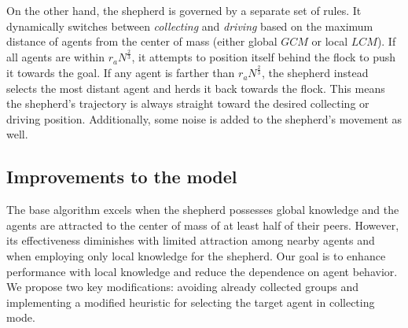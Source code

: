 \documentclass[9pt]{pnas-new}
\begin{document}
On the other hand, the shepherd is governed by a separate set of rules. It dynamically switches between \textit{collecting} and \textit{driving} based on the maximum distance of agents from the center of mass (either global $GCM$ or local $LCM$). If all agents are within $r_aN^\frac{2}{3}$, it attempts to position itself behind the flock to push it towards the goal. If any agent is farther than $r_aN^{\frac{2}{3}}$, the shepherd instead selects the most distant agent and herds it back towards the flock. This means the shepherd's trajectory is always straight toward the desired collecting or driving position. Additionally, some noise is added to the shepherd's movement as well.

\subsection{Improvements to the model}
The base algorithm excels when the shepherd possesses global knowledge and the agents are attracted to the center of mass of at least half of their peers. However, its effectiveness diminishes with limited attraction among nearby agents and when employing only local knowledge for the shepherd. Our goal is to enhance performance with local knowledge and reduce the dependence on agent behavior. We propose two key modifications: avoiding already collected groups and implementing a modified heuristic for selecting the target agent in collecting mode.
\end{document}
